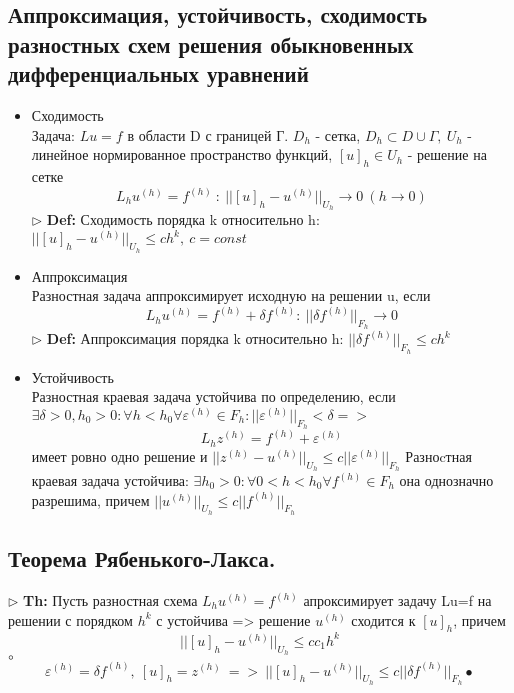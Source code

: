 \documentclass[a4paper]{article}
\begin{document}
\subsection{Аппроксимация, устойчивость, сходимость разностных схем решения обыкновенных дифференциальных уравнений}
\begin{itemize}
	\item Сходимость\\
	Задача: $Lu=f$ в области D с границей Г. $D_h$ - сетка, $D_h \subset D \cup \Gamma, \ U_h$ - линейное нормированное пространство функций, $[u]_h \in U_h$ - решение на сетке
	$$ L_hu^{(h)} = f^{(h)}\ : \ ||[u]_h -u^{(h)}||_{U_h} \rightarrow 0 \ (h \rightarrow 0)$$
	$\triangleright$ \textbf{Def:} Сходимость порядка k относительно h: $||[u]_h -u^{(h)}||_{U_h} \leq ch^k, \ c=const$ \\
	\item Аппроксимация \\
	Разностная задача аппроксимирует исходную на решении u, если
	$$ L_hu^{(h)}=f^{(h)}+\delta f^{(h)}: \ ||\delta f^{(h)}||_{F_h} \rightarrow 0 $$
	$\triangleright$ \textbf{Def:} Аппроксимация порядка k относительно h: $||\delta f^{(h)}||_{F_h} \leq ch^k$
	\item Устойчивость \\
	Разностная краевая задача устойчива по определению, если $\exists \delta >0, h_0>0: \forall h<h_0 \forall \varepsilon^{(h)} \in F_h: ||\varepsilon^{(h)}||_{F_h} < \delta =>$
	$$ L_hz^{(h)} = f^{(h)}+\varepsilon^{(h)}$$ имеет ровно одно решение и $||z^{(h)}-u^{(h)}||_{U_h} \leq c||\varepsilon^{(h)}||_{F_h}$
	Разноcтная краевая задача устойчива: $\exists h_0>0: \forall 0<h<h_0 \forall f^{(h)}\in F_h$ она однозначно разрешима, причем $||u^{(h)}||_{U_h} \leq c||f^{(h)}||_{F_h}$
\end{itemize}
\subsection{Теорема Рябенького-Лакса.}
$\triangleright$ \textbf{Th:} Пусть разностная схема $L_hu^{(h)}=f^{(h)}$ апроксимирует задачу Lu=f на решении с порядком $h^k$ с устойчива => решение $u^{(h)}$ сходится к $[u]_h$, причем $$ ||[u]_h - u^{(h)}||_{U_h} \leq cc_1h^k $$
	$\circ$ 
	$$ \varepsilon^{(h)}=\delta f^{(h)},\ [u]_h=z^{(h)} \ => \ ||[u]_h - u^{(h)}||_{U_h} \leq c||\delta f^{(h)}||_{F_h}
	\bullet$$
\end{document}
